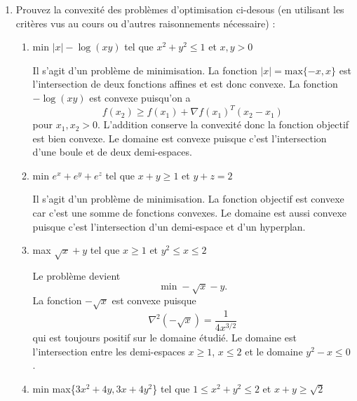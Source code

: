 \begin{enumerate}
  
  \item Prouvez la convexité des problèmes d'optimisation ci-desous
  (en utilisant les critères vus au cours ou d'autres raisonnements
  nécessaire) :
  \begin{enumerate}
    \item min $|x| - \log{(xy)}$ tel que $x^2 + y^2 \leq 1$ et $x,y > 0$
    \begin{solution}
      Il s'agit d'un problème de minimisation.
      La fonction $|x| = \mbox{max}\{-x,x\}$ est l'intersection de deux 
      fonctions affines et est donc convexe.
      La fonction $-\log{(xy)}$ est convexe puisqu'on a 
      \[ f(x_2) \geq f(x_1) + \nabla f(x_1)^T (x_2 - x_1) \]
      pour $x_1,x_2 > 0$.
      L'addition conserve la convexité donc la fonction objectif est bien convexe.
      Le domaine est convexe puisque 
      c'est l'intersection d'une boule et de deux demi-espaces. 
    \end{solution}
    
    \item min $e^x + e^y + e^z$ tel que $x + y \geq 1$ et $y+z = 2$
    \begin{solution}
      Il s'agit d'un problème de minimisation.
      La fonction objectif est convexe car c'est une somme de fonctions convexes.
      Le domaine est aussi convexe puisque c'est l'intersection
      d'un demi-espace et d'un hyperplan.
    \end{solution}
    
    \item max $\sqrt{x} + y$ tel que $x\geq 1$ et $y^2\leq x\leq 2$
    \begin{solution}
      Le problème devient
      \[ \min -\sqrt{x} - y. \]
      La fonction $-\sqrt{x}$ est convexe puisque
      \[ \nabla^2 (-\sqrt{x}) = \frac{1}{4 x^{3/2}} \]
      qui est toujours positif sur le domaine étudié.
      Le domaine est l'intersection entre les demi-espaces $x\geq 1$, $x\leq 2$
      et le domaine $y^2 - x \leq 0$.
    \end{solution} 
    
    
    \item min max\{$3x^2 + 4y, 3x + 4y^2$\}
    tel que $1\leq x^2 + y^2 \leq 2$ et $x + y \geq \sqrt{2}$
  \end{enumerate}
  

\end{enumerate}

